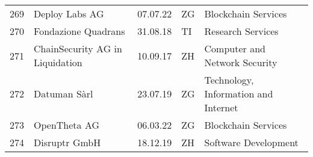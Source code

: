 \begin{tabular}{lllll}
269 &                                     Deploy Labs AG &      07.07.22 &     ZG &                            Blockchain Services \\
270 &                                Fondazione Quadrans &      31.08.18 &     TI &                              Research Services \\
271 &                    ChainSecurity AG in Liquidation &      10.09.17 &     ZH &                  Computer and Network Security \\
272 &                                       Datuman Sàrl &      23.07.19 &     ZG &           Technology, Information and Internet \\
273 &                                       OpenTheta AG &      06.03.22 &     ZG &                            Blockchain Services \\
274 &                                      Disruptr GmbH &      18.12.19 &     ZH &                           Software Development \\
\bottomrule
\end{tabular}
